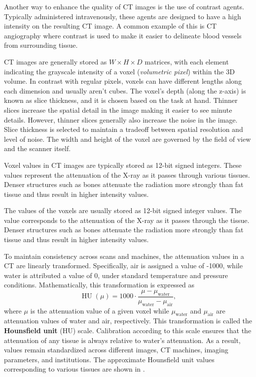 Another way to enhance the quality of CT images is the use of contrast agents. Typically administered intravenously, these agents are designed to have a high intensity on the resulting CT image. A common example of this is CT angiography where contrast is used to make it easier to delineate blood vessels from surrounding tissue.

CT images are generally stored as $W \times H \times D$ matrices, with each element indicating the grayscale intensity of a voxel (\textit{volumetric pixel}) within the 3D volume. In contrast with regular pixels, voxels can have different lengths along each dimension and usually aren't cubes. The voxel's depth (along the z-axis) is known as slice thickness, and it is chosen based on the task at hand. Thinner slices increase the spatial detail in the image making it easier to see minute details. However, thinner slices generally also increase the noise in the image. Slice thickness is selected to maintain a tradeoff between spatial resolution and level of noise. The width and height of the voxel are governed by the field of view and the scanner itself.

Voxel values in CT images are typically stored as 12-bit signed integers. These values represent the attenuation of the X-ray as it passes through various tissues. Denser structures such as bones attenuate the radiation more strongly than fat tissue and thus result in higher intensity values.

The values of the voxels are usually stored as 12-bit signed integer values. The value corresponds to the attenuation of the X-ray as it passes through the tissue. Denser structures such as bones attenuate the radiation more strongly than fat tissue and thus result in higher intensity values. 

To maintain consistency across scans and machines, the attenuation values in a CT are linearly transformed. Specifically, air is assigned a value of -1000, while water is attributed a value of 0, under standard temperature and pressure conditions. Mathematically, this transformation is expressed as
\begin{equation}
	{\operatorname{HU}(\mu)}=1000 \cdot {\frac {\mu -\mu _{\textrm {water}}}{\mu _{\textrm {water}}-\mu _{\textrm {air}}}},
\end{equation}
where $\mu$ is the attenuation value of a given voxel while $\mu_{\textrm {water}}$ and $\mu_{\textrm {air}}$ are attenuation values of water and air, respectively. This transformation is called the \textbf{Hounsfield unit} (HU) scale. Calibration according to this scale ensures that the attenuation of any tissue is always relative to water's attenuation. As a result, values remain standardized across different images, CT machines, imaging parameters, and institutions. The approximate Hounsfield unit values corresponding to various tissues are shown in .

